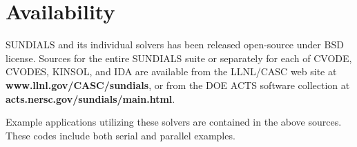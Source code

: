 \section{Availability}
\label{s:availability}

SUNDIALS and its individual solvers has been released open-source
under BSD license.
Sources for the entire SUNDIALS suite or separately for each of CVODE, 
CVODES, KINSOL, and IDA are available from the LLNL/CASC web site at
\newline \hspace*{.5in} {\bf www.llnl.gov/CASC/sundials},
\newline or from the DOE ACTS software collection at
\newline \hspace*{.5in} {\bf acts.nersc.gov/sundials/main.html}.

Example applications utilizing these solvers are contained in 
the above sources. These codes include both serial and parallel
examples.





